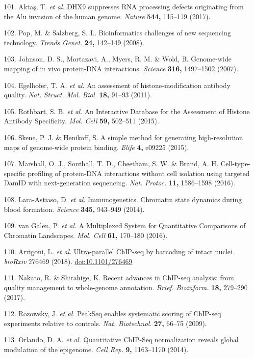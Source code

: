 \documentclass[11pt,twoside]{MPIthesis}
\theoremstyle{definition}
\theoremstyle{definition}
\theoremstyle{definition}
\theoremstyle{remark}
\begin{document}
101. Aktaş, T. \emph{et al.} DHX9 suppresses RNA processing defects
originating from the Alu invasion of the human genome. \emph{Nature}
\textbf{544,} 115--119 (2017).

102. Pop, M. \& Salzberg, S. L. Bioinformatics challenges of new
sequencing technology. \emph{Trends Genet.} \textbf{24,} 142--149
(2008).

103. Johnson, D. S., Mortazavi, A., Myers, R. M. \& Wold, B. Genome-wide
mapping of in vivo protein-DNA interactions. \emph{Science}
\textbf{316,} 1497--1502 (2007).

104. Egelhofer, T. A. \emph{et al.} An assessment of
histone-modification antibody quality. \emph{Nat. Struct. Mol. Biol.}
\textbf{18,} 91--93 (2011).

105. Rothbart, S. B. \emph{et al.} An Interactive Database for the
Assessment of Histone Antibody Specificity. \emph{Mol. Cell}
\textbf{59,} 502--511 (2015).

106. Skene, P. J. \& Henikoff, S. A simple method for generating
high-resolution maps of genome-wide protein binding. \emph{Elife}
\textbf{4,} e09225 (2015).

107. Marshall, O. J., Southall, T. D., Cheetham, S. W. \& Brand, A. H.
Cell-type-specific profiling of protein-DNA interactions without cell
isolation using targeted DamID with next-generation sequencing.
\emph{Nat. Protoc.} \textbf{11,} 1586--1598 (2016).

108. Lara-Astiaso, D. \emph{et al.} Immunogenetics. Chromatin state
dynamics during blood formation. \emph{Science} \textbf{345,} 943--949
(2014).

109. van Galen, P. \emph{et al.} A Multiplexed System for Quantitative
Comparisons of Chromatin Landscapes. \emph{Mol. Cell} \textbf{61,}
170--180 (2016).

110. Arrigoni, L. \emph{et al.} Ultra-parallel ChIP-seq by barcoding of
intact nuclei. \emph{bioRxiv} 276469 (2018). \url{doi:10.1101/276469}

111. Nakato, R. \& Shirahige, K. Recent advances in ChIP-seq analysis:
from quality management to whole-genome annotation. \emph{Brief.
Bioinform.} \textbf{18,} 279--290 (2017).

112. Rozowsky, J. \emph{et al.} PeakSeq enables systematic scoring of
ChIP-seq experiments relative to controls. \emph{Nat. Biotechnol.}
\textbf{27,} 66--75 (2009).

113. Orlando, D. A. \emph{et al.} Quantitative ChIP-Seq normalization
reveals global modulation of the epigenome. \emph{Cell Rep.} \textbf{9,}
1163--1170 (2014).
\end{document}
